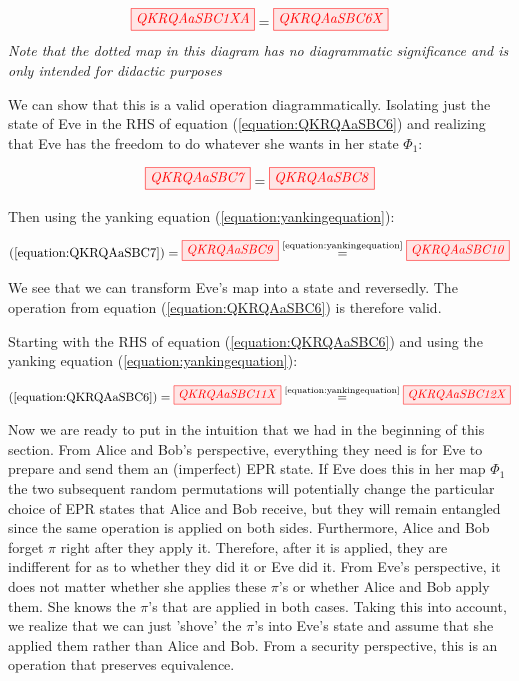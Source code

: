 \documentclass[]{article}
\newcommand{\equaltext}[1]{\ensuremath{\stackrel{\text{#1}}{=}}}
\begin{document}
\begin{equation}
\label{equation:QKRQAaSBC6}
\tikzfig{QKRQAaSBC1XA} = \tikzfig{QKRQAaSBC6X}
\end{equation}
\textit{Note that the dotted map in this diagram has no diagrammatic significance and is only intended for didactic purposes}

We can show that this is a valid operation diagrammatically. Isolating just the state of Eve in the RHS of equation (\ref{equation:QKRQAaSBC6}) and realizing that Eve has the freedom to do whatever she wants in her state $\Phi_1$:

\begin{equation}
\label{equation:QKRQAaSBC7}
\tikzfig{QKRQAaSBC7} = \tikzfig{QKRQAaSBC8}
\end{equation}

Then using the yanking equation (\ref{equation:yankingequation}):

\begin{equation}
\label{equation:QKRQAaSBC9}
(\ref{equation:QKRQAaSBC7}) = \tikzfig{QKRQAaSBC9} \equaltext{\ref{equation:yankingequation}} \tikzfig{QKRQAaSBC10}
\end{equation}

We see that we can transform Eve's map into a state and reversedly. The operation from equation (\ref{equation:QKRQAaSBC6}) is therefore valid.

Starting with the RHS of equation (\ref{equation:QKRQAaSBC6}) and using the yanking equation (\ref{equation:yankingequation}):

\begin{equation}
\begin{aligned}
\label{equation:QKRQAaSBC11}
 (\ref{equation:QKRQAaSBC6}) = \tikzfig{QKRQAaSBC11X} \equaltext{\ref{equation:yankingequation}} \tikzfig{QKRQAaSBC12X}
\end{aligned}
\end{equation}

Now we are ready to put in the intuition that we had in the beginning of this section. From Alice and Bob's perspective, everything they need is for Eve to prepare and send them an (imperfect) EPR state. If Eve does this in her map $\Phi_1$ the two subsequent random permutations will potentially change the particular choice of EPR states that Alice and Bob receive, but they will remain entangled since the same operation is applied on both sides. Furthermore, Alice and Bob forget $\pi$ right after they apply it. Therefore, after it is applied, they are indifferent for as to whether they did it or Eve did it. From Eve's perspective, it does not matter whether she applies these $\pi$'s or whether Alice and Bob apply them. She knows the $\pi$'s that are applied in both cases. Taking this into account, we realize that we can just 'shove' the $\pi$'s into Eve's state and assume that she applied them rather than Alice and Bob. From a security perspective, this is an operation that preserves equivalence. 
\end{document}
